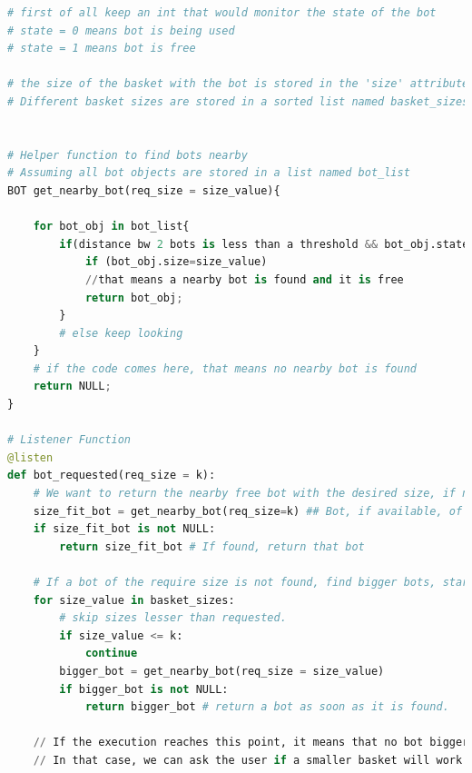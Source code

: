 \documentclass{article}
\begin{document}
\begin{lstlisting}[language=Python, caption=Customized baskets]
# first of all keep an int that would monitor the state of the bot
# state = 0 means bot is being used
# state = 1 means bot is free

# the size of the basket with the bot is stored in the 'size' attribute of Bot object.
# Different basket sizes are stored in a sorted list named basket_sizes


# Helper function to find bots nearby
# Assuming all bot objects are stored in a list named bot_list
BOT get_nearby_bot(req_size = size_value){
                     
    for bot_obj in bot_list{
        if(distance bw 2 bots is less than a threshold && bot_obj.state == 1){
            if (bot_obj.size=size_value)
            //that means a nearby bot is found and it is free
            return bot_obj;
        }
        # else keep looking
    }
    # if the code comes here, that means no nearby bot is found
    return NULL;
}

# Listener Function
@listen
def bot_requested(req_size = k):
    # We want to return the nearby free bot with the desired size, if not available, we want to return a free bot with a basket marginally biggen than requested.
    size_fit_bot = get_nearby_bot(req_size=k) ## Bot, if available, of the required size.
    if size_fit_bot is not NULL:
        return size_fit_bot # If found, return that bot

    # If a bot of the require size is not found, find bigger bots, starting with marginally bigger ones.
    for size_value in basket_sizes:
        # skip sizes lesser than requested.
        if size_value <= k:
            continue
        bigger_bot = get_nearby_bot(req_size = size_value)
        if bigger_bot is not NULL:
            return bigger_bot # return a bot as soon as it is found.

    // If the execution reaches this point, it means that no bot bigger than or equal to requested size is available. 
    // In that case, we can ask the user if a smaller basket will work and if there is no other way, we can combine two smaller bots as mentioned in part(c). 
\end{lstlisting}

\end{document}
